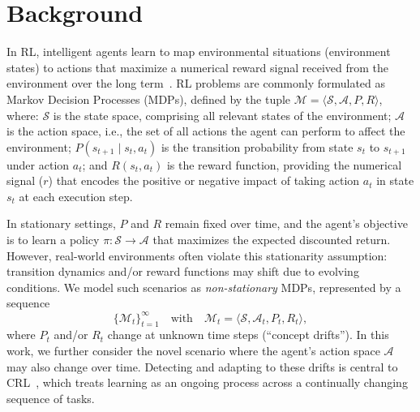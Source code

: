 
\section{Background}
\label{sec:background}

In \ac{RL}, intelligent agents learn to map environmental situations (environment states) to actions that maximize a numerical reward signal received from the environment over the long term~\cite{sutton18}. \ac{RL} problems are commonly formulated as Markov Decision Processes (MDPs), defined by the tuple $\mathcal{M} = \langle \mathcal{S}, \mathcal{A}, P, R \rangle$, where:
$\mathcal{S}$ is the state space, comprising all relevant states of the environment;
$\mathcal{A}$ is the action space, i.e., the set of all actions the agent can perform to affect the environment;
$P(s_{t+1} \mid s_t, a_t)$ is the transition probability from state {\color{purple}$s_t$} to {\color{purple}$s_{t+1}$} under action {\color{purple}$a_t$}; and
$R(s_t, a_t)$ is the reward function, providing the numerical signal ($r$) that encodes the positive or negative impact of taking action {\color{purple}$a_t$} in state {\color{purple}$s_t$} at each execution step.

In stationary settings, $P$ and $R$ remain fixed over time, and the agent’s objective is to learn a policy $\pi: \mathcal{S} \to \mathcal{A}$ that maximizes the expected discounted return. However, real-world environments often violate this stationarity assumption: transition dynamics and/or reward functions may shift due to evolving conditions. We model such scenarios as \emph{non-stationary} MDPs, represented by a sequence
\[
\{\mathcal{M}_t\}_{t=1}^\infty
\quad\text{with}\quad
\mathcal{M}_t = \bigl\langle \mathcal{S}, \mathcal{A}_t, P_t, R_t\bigr\rangle,
\]
where $P_t$ and/or $R_t$ change at unknown time steps (``concept drifts''). In this work, we further consider the novel scenario where the agent's action space $\mathcal{A}$ may also change over time. Detecting and adapting to these drifts is central to \ac{CRL}~\cite{khetarpal2022continualreinforcementlearningreview,abel2023definitioncontinualreinforcementlearning}, which treats learning as an ongoing process across a continually changing sequence of tasks.

